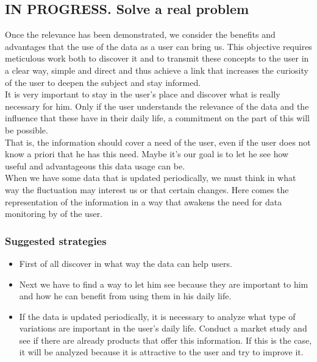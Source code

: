 \subsection{IN PROGRESS. Solve a real problem}

Once the relevance has been demonstrated, we consider the benefits and advantages that the use of the data as a user can bring us.
This objective requires meticulous work both to discover it and to transmit these concepts to the user in a clear way,
simple and direct and thus achieve a link that increases the curiosity of the user to deepen the subject and stay informed.\\

It is very important to stay in the user's place and discover what is really necessary for him.
Only if the user understands the relevance of the data and the influence that these have in their daily life, a commitment on the part of this will be possible.\\

That is, the information should cover a need of the user, even if the user does not know a priori that he has this need.
Maybe it's our goal is to let he see how useful and advantageous this data usage can be.\\

When we have some data that is updated periodically, we must think in what way the fluctuation may interest us or that certain changes.
Here comes the representation of the information in a way that awakens the need for data monitoring by of the user.

\subsubsection*{Suggested strategies} 

\begin{itemize}
    \item First of all discover in what way the data can help users.
    \item Next we have to find a way to let him see because they are important to him and how he can benefit from using them in his daily life.
    \item If the data is updated periodically, it is necessary to analyze what type of variations are important in the user's daily life.
    Conduct a market study and see if there are already products that offer this information.
    If this is the case, it will be analyzed because it is attractive to the user and try to improve it.
\end{itemize}

